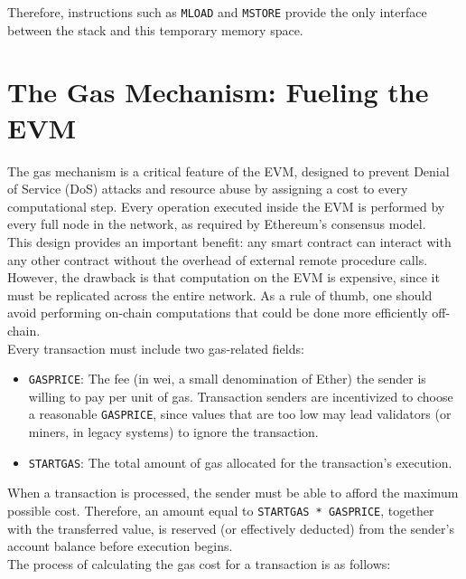 \documentclass{scrbook}
\begin{document}
Therefore, instructions such as \texttt{MLOAD} and \texttt{MSTORE} provide the only interface between the stack and this temporary memory space.

\section{The Gas Mechanism: Fueling the EVM}

The gas mechanism is a critical feature of the EVM, designed to prevent Denial of Service (DoS) attacks and resource abuse by assigning a cost to every computational step. Every operation executed inside the EVM is performed by every full node in the network, as required by Ethereum's consensus model.\\

This design provides an important benefit: any smart contract can interact with any other contract without the overhead of external remote procedure calls. However, the drawback is that computation on the EVM is expensive, since it must be replicated across the entire network. As a rule of thumb, one should avoid performing on-chain computations that could be done more efficiently off-chain.\\

Every transaction must include two gas-related fields:

\begin{itemize}
    \item \texttt{GASPRICE}: The fee (in wei, a small denomination of Ether) the sender is willing to pay per unit of gas. Transaction senders are incentivized to choose a reasonable \texttt{GASPRICE}, since values that are too low may lead validators (or miners, in legacy systems) to ignore the transaction.
    
    \item \texttt{STARTGAS}: The total amount of gas allocated for the transaction's execution.
\end{itemize}

When a transaction is processed, the sender must be able to afford the maximum possible cost. Therefore, an amount equal to \texttt{STARTGAS * GASPRICE}, together with the transferred value, is reserved (or effectively deducted) from the sender's account balance before execution begins.\\

The process of calculating the gas cost for a transaction is as follows:
\end{document}
